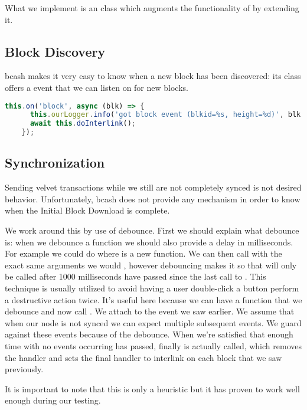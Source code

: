 What we implement is an  class which augments the functionality of  by extending it.

\subsection{Block Discovery}
bcash makes it very easy to know when a new block has been discovered: its  class offers a  event that we can listen on for new blocks.

\begin{lstlisting}[language=js]
    this.on('block', async (blk) => {
      this.ourLogger.info('got block event (blkid=%s, height=%d)', blk.rhash(), blk.height);
      await this.doInterlink();
    });
\end{lstlisting}

\subsection{Synchronization}
Sending velvet transactions while we still are not completely synced is not desired behavior. Unfortunately, bcash does not provide any mechanism in order to know when the Initial Block Download is complete.

We work around this by use of debounce. First we should explain what debounce is: when we debounce a function  we should also provide a delay in milliseconds. For example we could do  where  is a new function. We can then call  with the exact same arguments we would , however debouncing makes it so that  will only be called after 1000 milliseconds have passed since the last call to . This technique is usually utilized to avoid having a user double-click a button perform a destructive action twice. It's useful here because we can have a function  that we debounce and now call . We attach  to the  event we saw earlier. We assume that when our node is not synced we can expect multiple subsequent  events. We guard against these events because of the debounce. When we're satisfied that enough time with no events occurring has passed, finally  is actually called, which removes the  handler and sets the final handler to interlink on each block that we saw previously.

It is important to note that this is only a heuristic but it has proven to work well enough during our testing.

